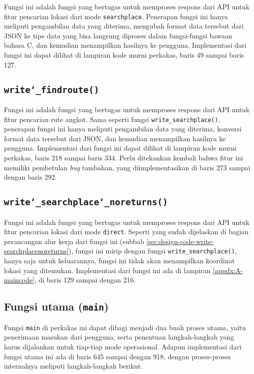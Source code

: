 Fungsi ini adalah fungsi yang bertugas untuk memproses respons dari API untuk fitur pencarian lokasi dari mode \verb|searchplace|. Penerapan fungsi ini hanya meliputi pengambilan data yang diterima, mengubah format data tersebut dari JSON ke tipe data yang bisa langsung diproses dalam fungsi-fungsi bawaan bahasa C, dan kemudian menampilkan hasilnya ke pengguna. Implementasi dari fungsi ini dapat dilihat di lampiran kode murni perkakas, baris 49 sampai baris 127.
	
\subsection{\texttt{write\char`_findroute()}}
\label{sec:testing-implementation-write-findroute}

Fungsi ini adalah fungsi yang bertugas untuk memproses respons dari API untuk fitur pencarian rute angkot. Sama seperti fungsi \verb|write_searchplace()|, penerapan fungsi ini hanya meliputi pengambilan data yang diterima, konversi format data tersebut dari JSON, dan kemudian menampilkan hasilnya ke pengguna. Implementasi dari fungsi ini dapat dilihat di lampiran kode murni perkakas, baris 218 sampai baris 334. Perlu ditekankan kembali bahwa fitur ini memiliki pembetulan \textit{bug} tambahan, yang diimplementasikan di baris 273 sampai dengan baris 292.

\subsection{\texttt{write\char`_searchplace\char`_noreturns()}}
\label{sec:testing-implementation-write-searchplacenoreturns}

Fungsi ini adalah fungsi yang bertugas untuk memproses respons dari API untuk fitur pencarian lokasi dari mode \verb|direct|. Seperti yang sudah dijelaskan di bagian perancangan alur kerja dari fungsi ini (subbab \ref{sec:design-code-write-searchplacenoreturns}), fungsi ini mirip dengan fungsi \verb|write_searchplace()|, hanya saja untuk keluarannya, fungsi ini tidak akan menampilkan koordinat lokasi yang ditemukan. Implementasi dari  fungsi ini ada di lampiran \ref{appdx:A-maincode}, di baris 129 sampai dengan 216.

\subsection{Fungsi utama (\texttt{main})}
\label{sec:testing-implementation-main}

Fungsi \verb|main| di perkakas ini dapat dibagi menjadi dua buah proses utama, yaitu penerimaan masukan dari pengguna, serta penentuan langkah-langkah yang harus dijalankan untuk tiap-tiap mode operasional. Adapun implementasi dari fungsi utama ini ada di baris 645 sampai dengan 918, dengan proses-proses internalnya meliputi langkah-langkah berikut.

